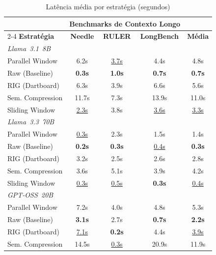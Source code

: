 \begin{table}[htbp]
    \centering
    \caption{Latência média por estratégia (segundos)}
    \label{tab:benchmark-latency}
    \begin{tabular}{lccc|c}
    \toprule
    & \multicolumn{3}{c}{\textbf{Benchmarks de Contexto Longo}} & \\
    \cmidrule(lr){2-4}
    \textbf{Estratégia} & \textbf{Needle} & \textbf{RULER} & \textbf{LongBench} & \textbf{Média} \\
    \midrule
    \multicolumn{5}{l}{\textit{Llama~3.1~8B}} \\
    Parallel Window    & 6.2s          & \underline{3.7s} & 4.4s          & 4.8s \\
    Raw (Baseline)     & \textbf{0.3s} & \textbf{1.0s}    & \textbf{0.7s} & \textbf{0.7s} \\
    RIG (Dartboard)    & 6.3s          & 3.9s             & 6.6s          & 5.6s \\
    Sem. Compression   & 11.7s         & 7.3s             & 13.9s         & 11.0s \\
    Sliding Window     & \underline{2.3s} & 3.8s          & \underline{3.6s} & \underline{3.3s} \\
    \midrule
    \multicolumn{5}{l}{\textit{Llama~3.3~70B}} \\
    Parallel Window    & \underline{0.3s} & 2.3s          & 1.5s          & 1.4s \\
    Raw (Baseline)     & \textbf{0.2s} & \textbf{0.3s}    & \underline{0.4s} & \textbf{0.3s} \\
    RIG (Dartboard)    & 3.2s          & 2.5s             & 2.6s          & 2.8s \\
    Sem. Compression   & 3.6s          & 5.1s             & 3.9s          & 4.2s \\
    Sliding Window     & \underline{0.3s} & \underline{0.5s} & \textbf{0.3s} & \underline{0.4s} \\
    \midrule
    \multicolumn{5}{l}{\textit{GPT-OSS~20B}} \\
    Parallel Window    & 7.2s          & 4.0s             & 4.8s          & 5.3s \\
    Raw (Baseline)     & \textbf{3.1s} & 2.7s             & \textbf{0.7s} & \textbf{2.2s} \\
    RIG (Dartboard)    & \underline{7.1s} & \textbf{0.2s} & 4.4s          & \underline{3.9s} \\
    Sem. Compression   & 14.5s         & \underline{0.3s} & 20.9s         & 11.9s \\

\end{tabular}
\end{table}
